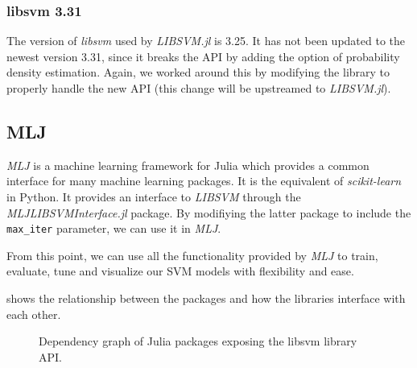 \subsubsection{libsvm 3.31}

The version of \emph{libsvm} used by \emph{LIBSVM.jl} is 3.25. It has not been updated to the
newest version 3.31, since it breaks the API by adding the option of
probability density estimation. Again, we worked around this by modifying the library to properly
handle the new API (this change will be upstreamed to \emph{LIBSVM.jl}). %

\subsection{MLJ}

\emph{MLJ} \cite{blaomMLJJuliaPackage2020} is a machine learning framework for Julia which provides a common interface
for many machine learning packages. It is the equivalent of \emph{scikit-learn} in Python. It provides
an interface to \emph{LIBSVM} through the \emph{MLJLIBSVMInterface.jl} package. By modifiying the latter
package to include the \texttt{max\_iter} parameter, we can use it in \emph{MLJ}.

From this point, we can use all the functionality provided by \emph{MLJ} to train, evaluate,
tune and visualize our SVM models with flexibility and ease.

 shows the relationship between the packages and how the
libraries interface with each other.

\begin{figure}[H]
\caption{Dependency graph of Julia packages exposing the libsvm library API.}
\label{fig:julia_libsvm_deps}
\end{figure}

